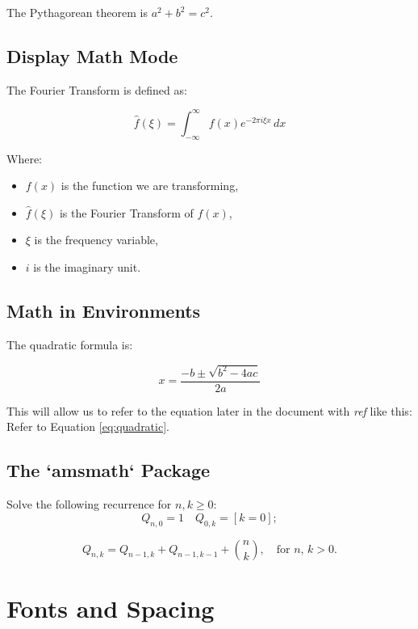 \documentclass{article}
\newcommand{\cmd}[1]{\textit{#1}}
\begin{document}
The Pythagorean theorem is $a^2 + b^2 = c^2$.

\subsection{Display Math Mode}

The Fourier Transform is defined as:

\[
\hat{f}(\xi) = \int_{-\infty}^\infty f(x) e^{-2\pi i \xi x} \, dx
\]

Where:
\begin{itemize}
  \item \( f(x) \) is the function we are transforming,
  \item \( \hat{f}(\xi) \) is the Fourier Transform of \( f(x) \),
  \item \( \xi \) is the frequency variable,
  \item \( i \) is the imaginary unit.
\end{itemize}

\subsection{Math in Environments}

The quadratic formula is:

\begin{equation}
x = \frac{-b \pm \sqrt{b^2 - 4ac}}{2a}
\label{eq:quadratic}
\end{equation}

This will allow us to refer to the equation later in the document with \cmd{ref} like this:
Refer to Equation \ref{eq:quadratic}.

\subsection{The `amsmath` Package}

Solve the following recurrence for $ n,k\geq 0 $:
\[
Q_{n,0} = 1   \quad Q_{0,k} = [k=0];
\]

\[
Q_{n,k} = Q_{n-1,k}+Q_{n-1,k-1}+\binom{n}{k}, \quad\text{for $n$, $k>0$.}
\]

\section{Fonts and Spacing}

\lipsum[1-2]
\end{document}
